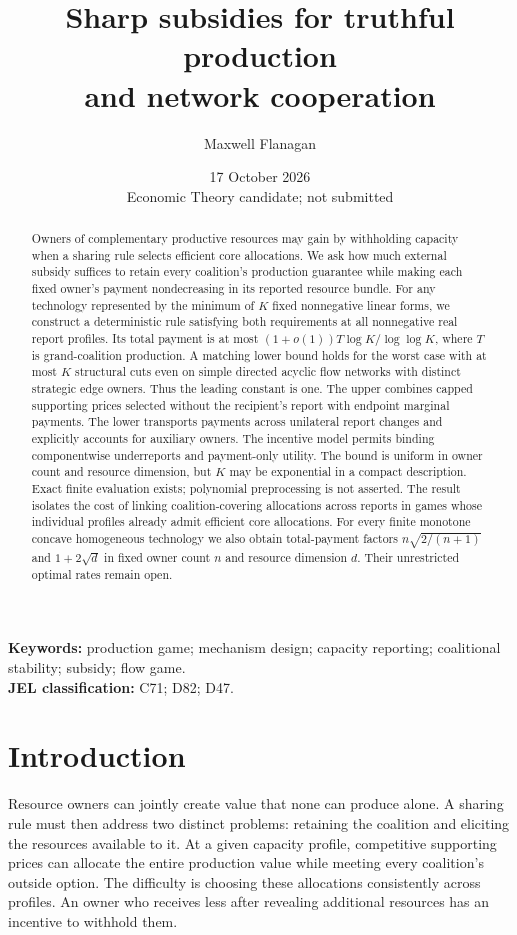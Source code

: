 \documentclass[11pt]{article}
\title{Sharp subsidies for truthful production\\and network cooperation}
\author{Maxwell Flanagan}
\date{17 October 2026\\[2pt]\small Economic Theory candidate; not submitted}
\theoremstyle{definition}\newtheorem{definition}[theorem]{Definition}
\theoremstyle{remark}\newtheorem{remark}[theorem]{Remark}
\begin{document}
\maketitle
\begin{abstract}
Owners of complementary productive resources may gain by withholding capacity
when a sharing rule selects efficient core allocations. We ask how much
external subsidy suffices to retain every coalition's production guarantee
while making each fixed owner's payment nondecreasing in its reported
resource bundle. For any technology represented by the minimum of $K$ fixed
nonnegative linear forms, we construct a deterministic rule satisfying both
requirements at all nonnegative real report profiles. Its total payment is
at most $(1+o(1))T\log K/\log\log K$, where $T$ is grand-coalition production.
A matching lower bound holds for the worst case with at most $K$ structural
cuts even on simple directed acyclic flow networks with distinct strategic
edge owners. Thus the leading constant is one. The upper combines capped
supporting prices selected without the recipient's report with endpoint
marginal payments. The lower transports payments across unilateral report
changes and explicitly accounts for auxiliary owners. The incentive model
permits binding componentwise underreports and payment-only utility.
The bound is uniform in owner count and resource dimension, but $K$ may be
exponential in a compact description. Exact finite evaluation exists;
polynomial preprocessing is not asserted. The result isolates the cost of
linking coalition-covering allocations across reports in games whose
individual profiles already admit efficient core allocations. For every finite
monotone concave homogeneous technology we also obtain total-payment factors
$n\sqrt{2/(n+1)}$ and $1+2\sqrt d$ in fixed owner count $n$ and resource
dimension $d$. Their unrestricted optimal rates remain open.
\end{abstract}
\noindent\textbf{Keywords:} production game; mechanism design; capacity reporting;
coalitional stability; subsidy; flow game.\\
\textbf{JEL classification:} C71; D82; D47.

\section{Introduction}
Resource owners can jointly create value that none can produce alone. A
sharing rule must then address two distinct problems: retaining the coalition
and eliciting the resources available to it. At a given capacity profile,
competitive supporting prices can allocate the entire production value while
meeting every coalition's outside option. The difficulty is choosing these
allocations consistently across profiles. An owner who receives less after
revealing additional resources has an incentive to withhold them.
\end{document}
